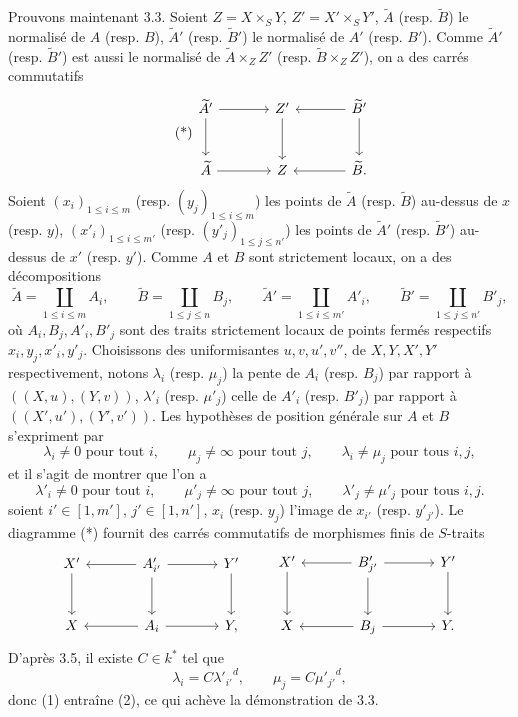 Prouvons maintenant 3.3. Soient $Z=X\times_SY$, $Z'=X'\times_SY'$, $\widetilde A$ (resp. $\widetilde B$) le normalisé de $A$ (resp. $B$), $\widetilde A'$ (resp. $\widetilde B'$) le normalisé de $A'$ (resp. $B'$). Comme $\widetilde A'$ (resp. $\widetilde B'$) est aussi le normalisé de $\widetilde A\times_ZZ'$ (resp. $\widetilde B\times_ZZ'$), on a des carrés commutatifs
\begin{equation}
\tag{*}
\begin{tikzcd}[column sep=large,row sep=large]
\widetilde A' \arrow[r] \arrow[d] & Z' \arrow[d] & \widetilde B' \arrow[l] \arrow[d]\\
\widetilde A \arrow[r] & Z & \widetilde B . \arrow[l]
\end{tikzcd}
\end{equation}
Soient $(x_i)_{1\le i\le m}$ (resp. $(y_j)_{1\le i\le m}$) les points de $\widetilde A$ (resp. $\widetilde B$) au-dessus de $x$ (resp. $y$), $(x'_i)_{1\le i\le m'}$ (resp. $(y'_j)_{1\le j\le n'}$) les points de $\widetilde A'$ (resp. $\widetilde B'$) au-dessus de $x'$ (resp. $y'$). Comme $A$ et $B$ sont strictement locaux, on a des décompositions
\[
\widetilde A=\coprod_{1\le i\le m}A_i,\qquad
\widetilde B=\coprod_{1\le j\le n}B_j,\qquad
\widetilde A'=\coprod_{1\le i\le m'}A'_i,\qquad
\widetilde B'=\coprod_{1\le j\le n'}B'_j,
\]
où $A_i,B_j,A'_i,B'_j$ sont des traits strictement locaux de points fermés respectifs $x_i,y_j,x'_i,y'_j$. Choisissons des uniformisantes $u,v,u',v''$, de $X,Y,X',Y'$ respectivement, notons $\lambda_i$ (resp. $\mu_j$) la pente de $A_i$ (resp. $B_j$) par rapport à $((X,u),(Y,v))$, $\lambda'_i$ (resp. $\mu'_j$) celle de $A'_i$ (resp. $B'_j$) par rapport à $((X',u'),(Y',v'))$. Les hypothèses de position générale sur $A$ et $B$ s'expriment par
\begin{equation}
\lambda_i\ne0\text{ pour tout }i,\qquad
\mu_j\ne\infty\text{ pour tout }j,\qquad
\lambda_i\ne\mu_j\text{ pour tous }i,j,
\tag{1}
\end{equation}
et il s'agit de montrer que l'on a
\begin{equation}
\lambda'_i\ne0\text{ pour tout }i,\qquad
\mu'_j\ne\infty\text{ pour tout }j,\qquad
\lambda'_j\ne\mu'_j\text{ pour tous }i,j.
\tag{2}
\end{equation}
soient $i'\in[1,m']$, $j'\in[1,n']$, $x_i$ (resp. $y_j$) l'image de $x_{i'}$ (resp. $y'_{j'}$). Le diagramme (*) fournit des carrés commutatifs de morphismes finis de $S$-traits
\[
\begin{tikzcd}[column sep=large,row sep=large]
X' \arrow[d] & A'_{i'} \arrow[l] \arrow[r] \arrow[d] & Y' \arrow[d]\\
X & A_i \arrow[l] \arrow[r] & Y ,
\end{tikzcd}
\qquad
\begin{tikzcd}[column sep=large,row sep=large]
X' \arrow[d] & B'_{j'} \arrow[l] \arrow[r] \arrow[d] & Y' \arrow[d]\\
X & B_j \arrow[l] \arrow[r] & Y .
\end{tikzcd}
\]
D'après 3.5, il existe $C\in k^*$ tel que
\[
\lambda_i=C{\lambda'_{i'}}^d,\qquad
\mu_j=C{\mu'_{j'}}^d,
\]
donc (1) entraîne (2), ce qui achève la démonstration de 3.3.

